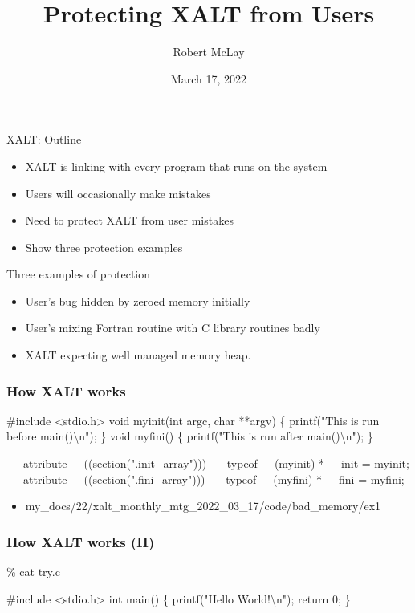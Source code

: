 \documentclass{beamer}
\begin{document}
\title[XALT]{Protecting XALT from Users}
\author{Robert McLay}
\date{March 17, 2022}

\frame{\titlepage}

\begin{frame}{XALT: Outline}
  \begin{itemize}
    \item XALT is linking with every program that runs on the system
    \item Users will occasionally make mistakes
    \item Need to protect XALT from user mistakes
    \item Show three protection examples 
  \end{itemize}
\end{frame}

\begin{frame}{Three examples of protection}
  \begin{itemize}
    \item User's bug hidden by zeroed memory initially
    \item User's mixing Fortran routine with C library routines badly
    \item XALT expecting well managed memory heap.
  \end{itemize}
\end{frame}


\begin{frame}[fragile]
    \frametitle{How XALT works}
 {\tiny
    \begin{semiverbatim}
#include <stdio.h>
void myinit(int argc, char **argv)
\{ printf("This is run before main()\textbackslash{}n"); \}
void myfini()
\{ printf("This is run after main()\textbackslash{}n"); \}

__attribute__((section(".init_array"))) __typeof__(myinit) *__init = myinit;
__attribute__((section(".fini_array"))) __typeof__(myfini) *__fini = myfini;
    \end{semiverbatim}
}
  \begin{itemize}
    \item my\_docs/22/xalt\_monthly\_mtg\_2022\_03\_17/code/bad\_memory/ex1
  \end{itemize}
\end{frame}

\begin{frame}[fragile]
    \frametitle{How XALT works (II)}
 {\small
    \begin{semiverbatim}
\% cat try.c

#include <stdio.h>
int main()
\{
  printf("Hello World!\textbackslash{}n");
  return 0;
\}

    \end{semiverbatim}
}
\end{frame}
\end{document}
